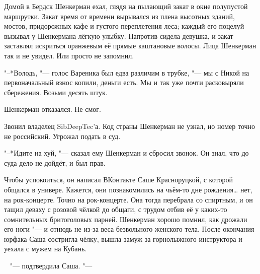 \asterism

Домой в Бердск Шенкерман ехал, глядя на пылающий закат в окне полупустой маршрутки.
Закат время от времени вырывался из плена высотных зданий, мостов, придорожных кафе и густого переплетения леса;
каждый его поцелуй вызывал у Шенкермана лёгкую улыбку.
Напротив сидела девушка, и закат заставлял искриться оранжевым её прямые каштановые волосы.
Лица Шенкерман так и не увидел.
Или просто не запомнил.

"--*Володь, "--- голос Вареника был едва различим в трубке, "--- мы с Никой на первоначальный взнос копили, деньги есть.
Мы и так уже почти расковыряли сбережения.
Возьми десять штук.

Шенкерман отказался.
Не смог.

Звонил владелец SibDeepTec'а.
Код страны Шенкерман не узнал, но номер точно не российский.
Угрожал подать в суд.

"--*Идите на хуй, "--- сказал ему Шенкерман и сбросил звонок.
Он знал, что до суда дело не дойдёт, и был прав.

Чтобы успокоиться, он написал ВКонтакте Саше Красноруцкой, с которой общался в универе.
Кажется, они познакомились на чьём-то дне рождения\ldots{} нет, на рок-концерте.
Точно на рок-концерте.
Она тогда перебрала со спиртным, и он тащил деваху с розовой чёлкой до общаги, с трудом отбив её у каких-то сомнительных бритоголовых парней.
Шенкерман хорошо помнил, как дрожали его ноги "--- и отнюдь не из-за веса безвольного женского тела.
После окончания юрфака Саша состригла чёлку, вышла замуж за горнолыжного инструктора и уехала с мужем на Кубань.

\hspace{0.2em}


~ "--- подтвердила Саша. "---

\hspace{0.2em}






